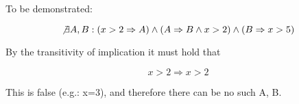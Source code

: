 To be demonstrated:

$$ \not\exists A,B: (x>2 \Rightarrow A) \land (A \Rightarrow B \land x>2) \land (B \Rightarrow x>5) $$

By the transitivity of implication it must hold that

$$ x>2 \Rightarrow x>2 $$

This is false (e.g.: x=3), and therefore there can be no such A, B.

\iffalse

x>2↦A
A↦B
B↦x>5

Transitiv muss also gelten:

x>2↦x>5

und das ist nicht korrekt für x=3.

(x>2↦A)Λ(A↦BΛx>2)Λ(B↦x>5)

C==x>2
D==x>5

D↦C

(C↦A)Λ(A↦BΛC)Λ(B↦D)Λ(D↦C)Λ~(C↦D)

(~C∨A)Λ(~A∨(BΛC))Λ(~B∨D)Λ(~D∨C)Λ(~D∨C)Λ~(~C∨D)
(~C∨A)Λ(~A∨B)Λ(~A∨C)Λ(~B∨D)Λ(~D∨C)Λ(~D∨C)ΛCΛ(~D)

{{~C,A},{~A,B},{~A,C},{~B,D},{~D,C},{C},{~D}}
OLR auf C:
{{A},{~A,B},{~B,D},{~D}}
OLR auf ~D:
{{A},{~A,B},{~B}
OLR auf A:
{{B},{~B}}
OLR auf B:
{{}}

Daher falsch.
\fi
\bye
